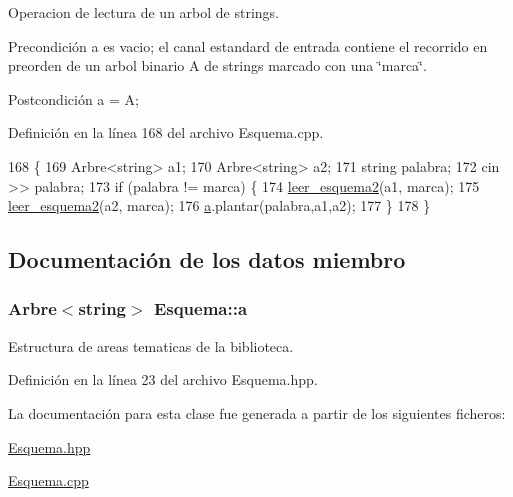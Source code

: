 Operacion de lectura de un arbol de strings. 

\begin{DoxyPrecond}{Precondición}
a es vacio; el canal estandard de entrada contiene el recorrido en preorden de un arbol binario A de strings marcado con una \char`\"{}marca\char`\"{}. 
\end{DoxyPrecond}
\begin{DoxyPostcond}{Postcondición}
a = A; 
\end{DoxyPostcond}


Definición en la línea 168 del archivo Esquema.\-cpp.


\begin{DoxyCode}
168                                                          \{
169     Arbre<string> a1;
170     Arbre<string> a2;
171     \textcolor{keywordtype}{string} palabra;
172     cin >> palabra;
173     \textcolor{keywordflow}{if} (palabra != marca) \{
174   \hyperlink{class_esquema_acdc1f43dae72e916d6baf7f53f973a21}{leer\_esquema2}(a1, marca);
175   \hyperlink{class_esquema_acdc1f43dae72e916d6baf7f53f973a21}{leer\_esquema2}(a2, marca);
176   \hyperlink{class_esquema_aee89f1d564d1951112b2f10a47f943aa}{a}.plantar(palabra,a1,a2);
177     \}
178 \}
\end{DoxyCode}


\subsection{Documentación de los datos miembro}
\hypertarget{class_esquema_aee89f1d564d1951112b2f10a47f943aa}{
\subsubsection[{a}]{\setlength{\rightskip}{0pt plus 5cm}Arbre$<$string$>$ Esquema\-::a\hspace{0.3cm}{\ttfamily [private]}}}\label{class_esquema_aee89f1d564d1951112b2f10a47f943aa}


Estructura de areas tematicas de la biblioteca. 



Definición en la línea 23 del archivo Esquema.\-hpp.



La documentación para esta clase fue generada a partir de los siguientes ficheros\-:\begin{DoxyCompactItemize}
\item 
\hyperlink{_esquema_8hpp}{Esquema.\-hpp}\item 
\hyperlink{_esquema_8cpp}{Esquema.\-cpp}\end{DoxyCompactItemize}
